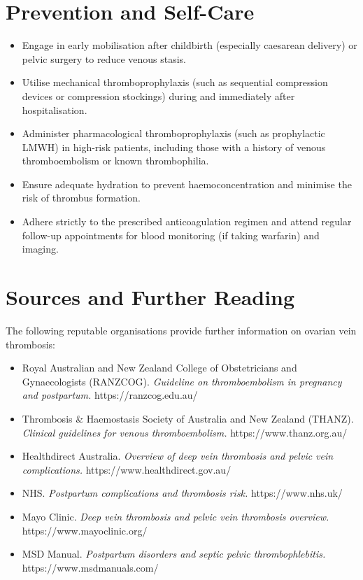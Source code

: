 \section*{Prevention and Self-Care}
\begin{itemize}
    \item Engage in early mobilisation after childbirth (especially caesarean delivery) or pelvic surgery to reduce venous stasis.
    \item Utilise mechanical thromboprophylaxis (such as sequential compression devices or compression stockings) during and immediately after hospitalisation.
    \item Administer pharmacological thromboprophylaxis (such as prophylactic LMWH) in high-risk patients, including those with a history of venous thromboembolism or known thrombophilia.
    \item Ensure adequate hydration to prevent haemoconcentration and minimise the risk of thrombus formation.
    \item Adhere strictly to the prescribed anticoagulation regimen and attend regular follow-up appointments for blood monitoring (if taking warfarin) and imaging.
\end{itemize}

\section*{Sources and Further Reading}
The following reputable organisations provide further information on ovarian vein thrombosis:
\begin{itemize}
    \item Royal Australian and New Zealand College of Obstetricians and Gynaecologists (RANZCOG). \textit{Guideline on thromboembolism in pregnancy and postpartum.} https://ranzcog.edu.au/
    \item Thrombosis \& Haemostasis Society of Australia and New Zealand (THANZ). \textit{Clinical guidelines for venous thromboembolism.} https://www.thanz.org.au/
    \item Healthdirect Australia. \textit{Overview of deep vein thrombosis and pelvic vein complications.} https://www.healthdirect.gov.au/
    \item NHS. \textit{Postpartum complications and thrombosis risk.} https://www.nhs.uk/
    \item Mayo Clinic. \textit{Deep vein thrombosis and pelvic vein thrombosis overview.} https://www.mayoclinic.org/
    \item MSD Manual. \textit{Postpartum disorders and septic pelvic thrombophlebitis.} https://www.msdmanuals.com/
\end{itemize}
